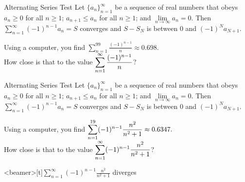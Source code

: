 \begin{frame}[t]
\begin{block}{Alternating Series Test}
Let $\big\{a_n\big\}_{n=1}^\infty$
be a sequence of real numbers that obeys
$a_n\ge 0$ for all $n\ge 1$;
$a_{n+1}\le a_n$  for all $n\ge 1$;
 and $\lim\limits_{n\rightarrow\infty}a_n=0$. Then
$\sum\limits_{n=1}^\infty (-1)^{n-1} a_n =S$
converges and  $S-S_N$ is between $0$ and  $(-1)^N a_{N+1}$. 
\end{block}

Using a computer, you find
$\displaystyle\sum_{n=1}^{99} \frac{(-1)^{n-1}}{n} \approx 0.698. $\\
How close is that to the value $\displaystyle\sum_{n=1}^{\infty}  \frac{(-1)^{n-1}}{n} $?

\end{frame}
\begin{frame}[t]
\begin{block}{Alternating Series Test}
Let $\big\{a_n\big\}_{n=1}^\infty$
be a sequence of real numbers that obeys
$a_n\ge 0$ for all $n\ge 1$;
$a_{n+1}\le a_n$  for all $n\ge 1$;
 and $\lim\limits_{n\rightarrow\infty}a_n=0$. Then
$\sum\limits_{n=1}^\infty (-1)^{n-1} a_n =S$
converges and  $S-S_N$ is between $0$ and  $(-1)^N a_{N+1}$. 
\end{block}

Using a computer, you find
$\displaystyle\sum_{n=1}^{19}(-1)^{n-1}\frac{n^2}{n^2+1} \approx 0.6347. $\\
How close is that to the value $\displaystyle\sum_{n=1}^{\infty} (-1)^{n-1}\frac{n^2}{n^2+1} $? 
\vfill

\end{frame}
\begin{frame}<beamer>[t]{$\sum_{n=1}^{\infty}(-1)^{n-1} \frac{n^2}{n^2+1} $ diverges}



\end{frame}
